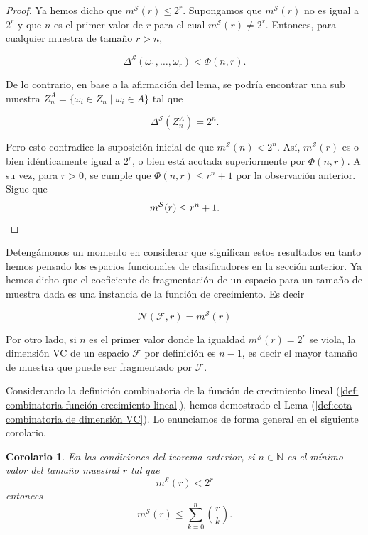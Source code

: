 \documentclass{report}
\newtheorem{cor}{Corolario}[thm]
\begin{document}
\begin{proof}
Ya hemos dicho que \( m^{\mathcal{S}}(r) \leq 2^r \). Supongamos que \( m^{\mathcal{S}}(r) \) no es 
 igual a \( 2^r \) y que \( n \) es el primer valor de \( r \) para el cual \( m^{\mathcal{S}}(r) \neq 2^r \). 
    Entonces, para cualquier muestra de tamaño \( r > n \),
    
    \[
    \Delta^{\mathcal{S}}(\omega_1, \dots, \omega_r) < \Phi(n, r).
    \]
    
    De lo contrario, en base a la afirmación del lema, se podría encontrar una sub muestra  
    \( Z_n^A = \{\omega_i \in Z_n \mid \omega_i \in A\} \) tal que  
    
    \[
    \Delta^{\mathcal{S}}\left(Z_n^A\right) = 2^n.
    \]
    
  Pero esto contradice la suposición inicial de que \( m^{\mathcal{S}}(n) < 2^n \).  
    Así, \( m^{\mathcal{S}}(r) \) es o bien idénticamente igual a \( 2^r \), o bien está acotada superiormente 
    por \( \Phi(n, r) \). A su vez, para \( r > 0 \), se cumple que \( \Phi(n, r) \leq r^n + 1 \) por la observación
    anterior. Sigue que 
    \[
        m^{\mathcal{S}}(r)   \leq r^n + 1.\newline
    \]
    
\end{proof}


Detengámonos un momento en considerar que significan estos resultados en tanto hemos pensado los espacios funcionales
de clasificadores en la sección anterior. Ya hemos dicho que el coeficiente de fragmentación de un espacio para un tamaño
de muestra dada es una instancia de la función de crecimiento. Es decir

\[
\mathcal{N}(\mathcal{F}, r) = m^{\mathcal{S}}(r)
\]

Por otro lado, si $n$ es el primer valor donde la igualdad $m^{\mathcal{S}}(r)=2^r$ se viola, la dimensión VC de un espacio $\mathcal{F}$ 
por definición es $n-1$, es decir el mayor tamaño de muestra que puede ser fragmentado por $\mathcal{F}$.\newline

Considerando la definición combinatoria de la función de crecimiento lineal (\ref{def: combinatoria función crecimiento lineal}),
hemos demostrado el Lema (\ref{def:cota combinatoria de dimensión VC}). Lo enunciamos de forma general en el siguiente corolario.

\begin{cor}
    En las condiciones del teorema anterior, si $n\in\mathbb{N}$ es el mínimo valor del tamaño muestral $r$ tal que    
    \[
        m^{\mathcal{S}}(r) < 2^r
    \]
    entonces
    \[
        m^{\mathcal{S}}(r) \leq \sum\limits_{k=0}^{n} \binom{r}{k}. 
    \]
\end{cor}
\end{document}
